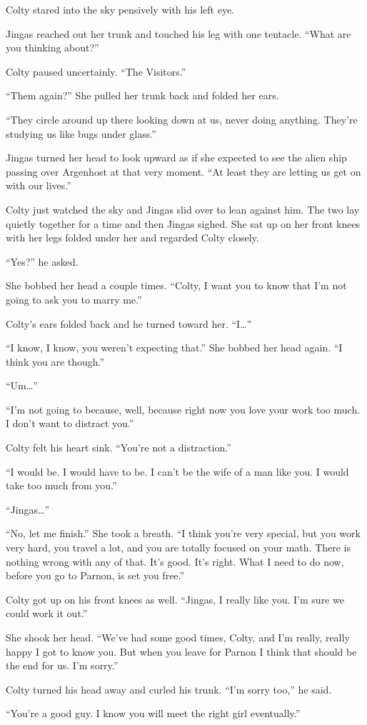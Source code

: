 Colty stared into the sky pensively with his left eye.

Jingas reached out her trunk and touched his leg with one tentacle. ``What are you
thinking about?''

Colty paused uncertainly. ``The Visitors.''

``Them again?'' She pulled her trunk back and folded her ears.

``They circle around up there looking down at us, never doing anything. They're studying us like
bugs under glass.''

Jingas turned her head to look upward as if she expected to see the alien ship passing over
Argenhost at that very moment. ``At least they are letting us get on with our lives.''

Colty just watched the sky and Jingas slid over to lean against him. The two lay quietly
together for a time and then Jingas sighed. She sat up on her front knees with her legs folded
under her and regarded Colty closely.

``Yes?'' he asked.

She bobbed her head a couple times. ``Colty, I want you to know that I'm not going to ask you to
marry me.''

Colty's ears folded back and he turned toward her. ``I\ldots''

``I know, I know, you weren't expecting that.'' She bobbed her head again. ``I think you are
though.''

``Um\ldots''


``I'm not going to because, well, because right now you love your work too much. I don't want to
distract you.''

Colty felt his heart sink. ``You're not a distraction.''

``I would be. I would have to be. I can't be the wife of a man like you. I would take too much
from you.''

``Jingas\ldots''

``No, let me finish.'' She took a breath. ``I think you're very special, but you work very hard,
you travel a lot, and you are totally focused on your math. There is nothing wrong with any of
that. It's good. It's right. What I need to do now, before you go to Parnon, is set you free.''

Colty got up on his front knees as well. ``Jingas, I really like you. I'm sure we could work
it out.''

She shook her head. ``We've had some good times, Colty, and I'm really, really happy I got to
know you. But when you leave for Parnon I think that should be the end for us. I'm sorry.''

Colty turned his head away and curled his trunk. ``I'm sorry too,'' he said.

``You're a good guy. I know you will meet the right girl eventually.''
